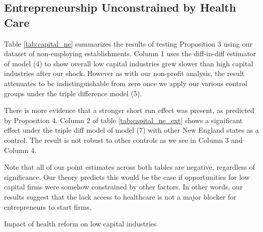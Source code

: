 \documentclass[12pt]{article}
\begin{document}
\subsection{Entrepreneurship Unconstrained by Health Care}

Table \ref{tab:capital_ne} summarizes the results of testing Proposition 3 using our dataset of non-employing establishments. Column 1 uses the diff-in-diff estimator of model (4) to show overall low capital industries grew slower than high capital industries after our shock. However as with our non-profit analysis, the result attenuates to be indistinguishable from zero once we apply our various control groups under the triple difference model (5). 

There is more evidence that a stronger short run effect was present, as predicted by Proposition 4. Column 2 of table \ref{tab:capital_ne_ext} shows a significant effect under the triple diff model of model (7) with other New England states as a control. The result is not robust to other controls as we see in Column 3 and Column 4. 

Note that all of our point estimates across both tables are negative, regardless of significance. Our theory predicts this would be the case if opportunities for low capital firms were somehow constrained by other factors. In other words, our results suggest that the lack access to healthcare is not a major blocker for entrepreneurs to start firms. 

\begin{table}[H]
	\centering
	\caption{Impact of health reform on low capital industries}
	
	\label{tab:capital_ne}
\end{table} 
\end{document}
